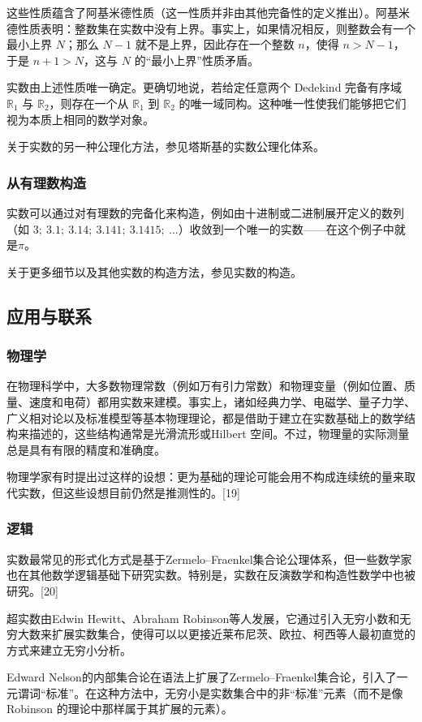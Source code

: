 这些性质蕴含了阿基米德性质（这一性质并非由其他完备性的定义推出）。阿基米德性质表明：整数集在实数中没有上界。事实上，如果情况相反，则整数会有一个最小上界 $N$；那么 $N-1$ 就不是上界，因此存在一个整数 $n$，使得 $n > N-1$，于是 $n+1 > N$，这与 $N$ 的“最小上界”性质矛盾。

实数由上述性质唯一确定。更确切地说，若给定任意两个 Dedekind 完备有序域 $\mathbb{R}_{1}$ 与 $\mathbb{R}_{2}$，则存在一个从 $\mathbb{R}_{1}$ 到 $\mathbb{R}_{2}$ 的唯一域同构。这种唯一性使我们能够把它们视为本质上相同的数学对象。

关于实数的另一种公理化方法，参见塔斯基的实数公理化体系。
\subsubsection{从有理数构造}
实数可以通过对有理数的完备化来构造，例如由十进制或二进制展开定义的数列（如 $3;\ 3.1;\ 3.14;\ 3.141;\ 3.1415;\ \ldots$）收敛到一个唯一的实数——在这个例子中就是$\pi$。

关于更多细节以及其他实数的构造方法，参见实数的构造。
\subsection{应用与联系}
\subsubsection{物理学}
在物理科学中，大多数物理常数（例如万有引力常数）和物理变量（例如位置、质量、速度和电荷）都用实数来建模。事实上，诸如经典力学、电磁学、量子力学、广义相对论以及标准模型等基本物理理论，都是借助于建立在实数基础上的数学结构来描述的，这些结构通常是光滑流形或Hilbert 空间。不过，物理量的实际测量总是具有有限的精度和准确度。

物理学家有时提出过这样的设想：更为基础的理论可能会用不构成连续统的量来取代实数，但这些设想目前仍然是推测性的。[19]
\subsubsection{逻辑}
实数最常见的形式化方式是基于Zermelo–Fraenkel集合论公理体系，但一些数学家也在其他数学逻辑基础下研究实数。特别是，实数在反演数学和构造性数学中也被研究。[20]

超实数由Edwin Hewitt、Abraham Robinson等人发展，它通过引入无穷小数和无穷大数来扩展实数集合，使得可以以更接近莱布尼茨、欧拉、柯西等人最初直觉的方式来建立无穷小分析。

Edward Nelson的内部集合论在语法上扩展了Zermelo–Fraenkel集合论，引入了一元谓词“标准”。在这种方法中，无穷小是实数集合中的非“标准”元素（而不是像 Robinson 的理论中那样属于其扩展的元素）。

